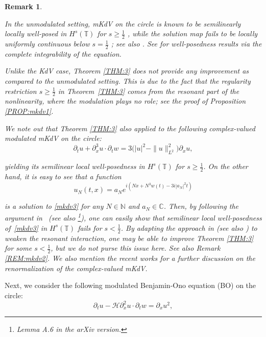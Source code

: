 \documentclass[letterpaper, 11pt,  reqno]{amsart}
\newtheorem{remark}[theorem]{Remark}
\newcommand{\1}{\hspace{0.5mm}\text{I}\hspace{0.5mm}}
\newcommand{\noi}{\noindent}
\newcommand{\C}{\mathbb{C}}
\newcommand{\T}{\mathbb{T}}
\renewcommand{\H}{\mathcal{H}}
\newcommand{\dx}{\partial_x}
\newcommand{\dt}{\partial_t}
\newcommand{\N}{\mathbb{N}}
\numberwithin{equation}{section}
\numberwithin{theorem}{section}
\begin{document}
\begin{remark}\label{REM:mkdv1}\rm

In the unmodulated setting, 
mKdV on the circle is known to be semilinearly locally well-posed in 
$H^s(\T)$ for $s \ge \frac 12$
\cite{BO93, KO}, 
while 
 the solution map
fails to be locally 
uniformly continuous below $s = \frac 12$
\cite{CCT, TT}; see also \cite{BO97}.
See \cite{KT2, Forlano}
for well-posedness results via the complete integrability of the equation.

Unlike the KdV case, 
Theorem \ref{THM:3}
does not provide any improvement as compared to the unmodulated setting.
This is due to the fact that 
the regularity restriction $s \ge \frac 12$  in Theorem~\ref{THM:3}
comes from  the resonant part of the nonlinearity, 
where the modulation plays no role;
see the proof of Proposition \ref{PROP:mkdv1}.


We note out that
Theorem \ref{THM:3}
also applied to the following
complex-valued modulated mKdV on the circle:
\begin{equation}
\label{mkdv3}
\dt u+   \dx^3 u \cdot \dt w=3   \big(|u|^2- \|u\|_{L^2}^2\big)\dx u, 
\end{equation}

\noi
yielding its semilinear local well-posedness in $H^s(\T)$ for $s \ge \frac 12$.
On the other hand, 
it is easy to see that a function 
\[ u_N(t, x) = a_N e^{i (Nx + N^3 w(t) - 3i |a_N|^2 t)}\]

\noi
is a solution to \eqref{mkdv3} for any $N \in \N$ and $a_N \in \C$.
Then, 
by following the argument in~\cite{BGT}
(see also \cite[Lemma 6.16]{OTz}\footnote{Lemma A.6 in the arXiv version.}), 
one can easily show that semilinear local well-posedness
of~\eqref{mkdv3}
in $H^s(\T)$
fails for $s < \frac 12$.
By adapting  the approach in  \cite{TT, NTT}
(see also \cite{OTzW, BLLZ})
to weaken the resonant interaction, 
one may be able to improve Theorem \ref{THM:3} for some $s  < \frac 12$, 
but we do not purse this issue here.
See also Remark \ref{REM:mkdv2}.
We also mention the recent works
 \cite{C1, C2}
for a further discussion on the renormalization of the complex-valued mKdV.


\end{remark}












Next, we consider the following 
modulated Benjamin-Ono equation (BO) on the circle:
\begin{equation}
\label{BO}
\dt u-    \H\dx^2 u \cdot \dt w=\dx u^2,
\end{equation}
\end{document}
